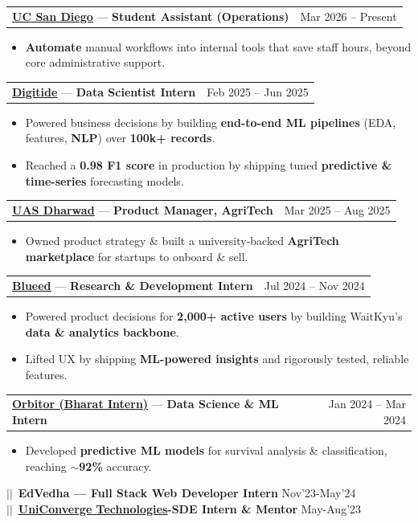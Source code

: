 \documentclass[letterpaper,11pt]{article}
\makeatletter
\newlength{\aeleft}  %
\newcommand{\resumeItem}[1]{
  \item\small{
    {#1 \vspace{-2pt}}
  }
}
\newcommand{\resumeExpHeading}[3]{
  \item
    \begin{tabular*}{0.97\textwidth}{l@{\extracolsep{\fill}}r}
      \textbf{#1} —  \textbf{#2} & \small #3 \\
    \end{tabular*}\vspace{-7pt}
}
\newcommand{\resumeItemListStart}{\begin{itemize}[leftmargin=0.2in, rightmargin=-0.2in]}
\newcommand{\resumeItemListEnd}{\end{itemize}\vspace{-5pt}}
\makeatother
\begin{document}
    \resumeExpHeading
      {\href{https://ucsd.edu}{\underline{UC San Diego}}}{Student Assistant (Operations)}{Mar 2026 -- Present}
      \resumeItemListStart
        \resumeItem{\textbf{Automate} manual workflows into internal tools that save staff hours, beyond core administrative support.}
      \resumeItemListEnd

    \resumeExpHeading
      {\href{https://www.digitide.com/}{\underline{Digitide}}}{Data Scientist Intern}{Feb 2025 -- Jun 2025}
      \resumeItemListStart
        \resumeItem{Powered business decisions by building \textbf{end-to-end ML pipelines} (EDA, features, \textbf{NLP}) over \textbf{100k+ records}.}
        \resumeItem{Reached a \textbf{0.98 F1 score} in production by shipping tuned \textbf{predictive \& time-series} forecasting models.}
      \resumeItemListEnd

    \resumeExpHeading
      {\href{https://krishik-abiuasd.org/}{\underline{UAS Dharwad}}}{Product Manager, AgriTech}{Mar 2025 -- Aug 2025}
      \resumeItemListStart
        \resumeItem{Owned product strategy \& built a university-backed \textbf{AgriTech marketplace} for startups to onboard \& sell.}
      \resumeItemListEnd

    \resumeExpHeading
      {\href{https://www.blueed.com/}{\underline{Blueed}}}{Research \& Development Intern}{Jul 2024 -- Nov 2024}
      \resumeItemListStart
        \resumeItem{Powered product decisions for \textbf{2,000+ active users} by building WaitKyu's \textbf{data \& analytics backbone}.}
        \resumeItem{Lifted UX by shipping \textbf{ML-powered insights} and rigorously tested, reliable features.}
      \resumeItemListEnd

    \resumeExpHeading
      {\href{https://www.linkedin.com/company/orbitor-official}{\underline{Orbitor (Bharat Intern)}}}{Data Science \& ML Intern}{Jan 2024 -- Mar 2024}
      \resumeItemListStart
        \resumeItem{Developed \textbf{predictive ML models} for survival analysis \& classification, reaching $\sim$\textbf{92\%} accuracy.}
      \resumeItemListEnd
      $||$\ \textbf{EdVedha — \small{Full Stack Web Developer Intern}} Nov'23-May'24\\
      $||$\ \textbf{{\href{https://www.linkedin.com/company/uniconvergetechnologies}{\underline{UniConverge Technologies}}}-\small{SDE Intern \& Mentor}} May-Aug'23\\
\end{document}
